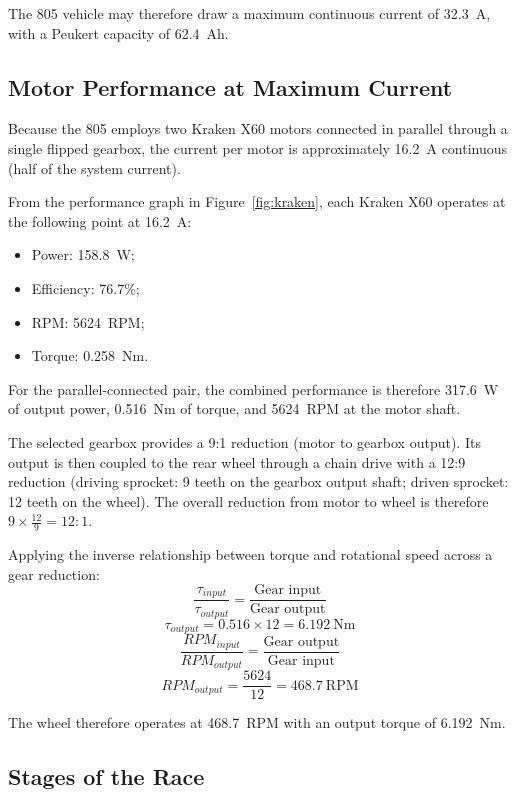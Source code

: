 \documentclass[12pt]{article}
\begin{document}
The 805 vehicle may therefore draw a maximum continuous current of 32.3~A,
with a Peukert capacity of 62.4~Ah.

\subsection{Motor Performance at Maximum Current}

Because the 805 employs two Kraken X60 motors connected in parallel through
a single flipped gearbox, the current per motor is approximately 16.2~A
continuous (half of the system current).

From the performance graph in Figure~\ref{fig:kraken}, each Kraken X60
operates at the following point at 16.2~A:
\begin{itemize}
  \item Power: 158.8~W;
  \item Efficiency: 76.7\%;
  \item RPM: 5624~RPM;
  \item Torque: 0.258~Nm.
\end{itemize}

For the parallel-connected pair, the combined performance is therefore
317.6~W of output power, 0.516~Nm of torque, and 5624~RPM at the motor
shaft.

The selected gearbox provides a 9:1 reduction (motor to gearbox output).
Its output is then coupled to the rear wheel through a chain drive with a
12:9 reduction (driving sprocket: 9 teeth on the gearbox output shaft;
driven sprocket: 12 teeth on the wheel). The overall reduction from motor
to wheel is therefore $9 \times \frac{12}{9} = 12{:}1$.

Applying the inverse relationship between torque and rotational speed
across a gear reduction:
\begin{equation}
  \frac{\tau_{input}}{\tau_{output}} = \frac{\text{Gear input}}{\text{Gear output}}
  \label{eq:torquegear}
\end{equation}
\[
\tau_{output} = 0.516 \times 12 = 6.192~\text{Nm}
\]
\begin{equation}
  \frac{RPM_{input}}{RPM_{output}} = \frac{\text{Gear output}}{\text{Gear input}}
  \label{eq:rpmgear}
\end{equation}
\[
RPM_{output} = \frac{5624}{12} = 468.7~\text{RPM}
\]

The wheel therefore operates at 468.7~RPM with an output torque of
6.192~Nm.

\subsection{Stages of the Race}
\end{document}
